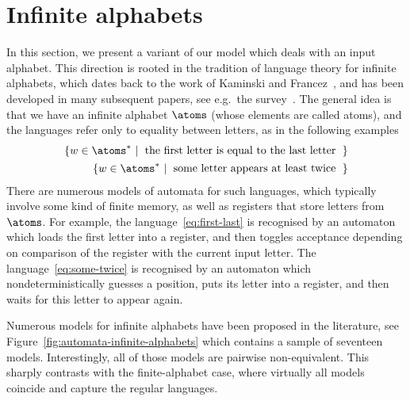 \section{Infinite alphabets}
\label{sec:infinite-alphabets}


In this section, we present a variant of our model which deals with an input alphabet. This direction is rooted in the tradition of language theory for infinite alphabets, which dates back to the work of Kaminski and Francez~\cite{kaminskiFiniteMemoryAutomata1994}, and has been developed in many subsequent papers, see e.g.~the survey~\cite{bojanczykOrbitFiniteSetsTheir2017}. The general idea is that we have an infinite alphabet $\atoms$ (whose elements are called atoms), and the languages  refer only to equality between letters, as in the following examples
\begin{align}
\setbuild{ w \in \atoms^*}{the first letter is equal to the last letter}
\label{eq:first-last}
\\
\setbuild{ w \in \atoms^*}{some letter appears at least twice}
\label{eq:some-twice}
\end{align}
There are numerous models of automata for such languages, which typically involve some kind of finite memory, as well as registers that store letters from $\atoms$. For example, the language~\eqref{eq:first-last} is recognised by an automaton which loads the first letter into a register, and then toggles acceptance depending on comparison of the register with the current input letter. The language~\eqref{eq:some-twice} is recognised by an automaton which nondeterministically guesses a position, puts its letter into a register, and then waits for this letter to appear again. 

Numerous models for infinite alphabets have been proposed in the literature,  see Figure~\ref{fig:automata-infinite-alphabets} which contains a sample of seventeen models. Interestingly, all of those models are pairwise non-equivalent. This sharply contrasts with the finite-alphabet case, where virtually all models coincide and capture the regular languages. 

